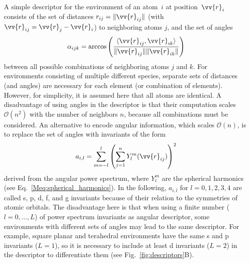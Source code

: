 \documentclass[%
superscriptaddress,
reprint,
nofootinbib,
amsmath,amssymb,amsfonts,
floatfix,
altaffilletter,
showkeys,
]{revtex4-2}
\begin{document}
A simple descriptor for the environment of an atom~$i$ at position~$\vv{r}_{i}$ consists of the set of distances $r_{ij} = \lVert \vv{r}_{ij}\rVert$ (with $\vv{r}_{ij} = \vv{r}_{j}- \vv{r}_{i}$) to neighboring atoms $j$, and the set of angles
\begin{equation}
\alpha_{ijk} = \mathrm{arccos}\left(\frac{\langle \vv{r}_{ij}, \vv{r}_{ik} \rangle}{\lVert \vv{r}_{ij}\rVert \lVert \vv{r}_{ik}\rVert}\right)
\label{eq:angles}
\end{equation}
between all possible combinations of neighboring atoms $j$ and $k$. For environments consisting of multiple different species, separate sets of distances (and angles) are necessary for each element (or combination of elements). However, for simplicity, it is assumed here that all atoms are identical. A disadvantage of using angles in the descriptor is that their computation scales $\mathcal{O}(n^2)$ with the number of neighbors $n$, because all combinations must be considered. An alternative to encode angular information, which scales $\mathcal{O}(n)$, is to replace the set of angles with invariants of the form
\begin{equation}
a_{i,l} = \sum_{m=-l}^{l} \left(\sum_{j=1}^{n} Y_l^m(\vv{r}_{ij})\right)^2
\label{eq:power_spectrum}
\end{equation}
derived from the angular power spectrum, where $Y_l^m$ are the spherical harmonics (see Eq.~\ref{Meq:spherical_harmonics}). In the following, $a_{i,l}$ for $l=0,1,2,3,4$ are called s, p, d, f, and g invariants because of their relation to the symmetries of atomic orbitals. The disadvantage here is that when using a finite number ($l=0,\dots,L$) of power spectrum invariants as angular descriptor, some environments with different sets of angles may lead to the same descriptor. For example, square planar and terahedral environments have the same s and p invariants ($L=1$), so it is necessary to include at least d invariants ($L=2$) in the descriptor to differentiate them (see Fig.~\ref{fig:descriptors}B).\\
\end{document}

